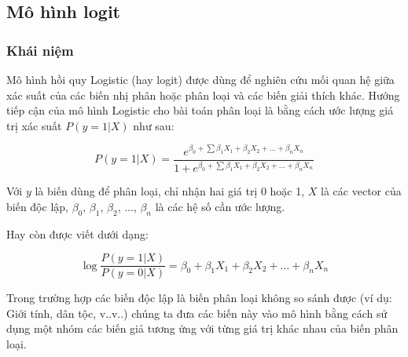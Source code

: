 \documentclass[a4paper]{report}\usepackage[]{graphicx}\usepackage[]{color}
\begin{document}
\subsection{Mô hình logit}

\subsubsection{Khái niệm}

Mô hình hồi quy Logistic (hay logit) được dùng để nghiên cứu mối quan hệ giữa xác suất của các biến nhị phân hoặc phân loại và các biến giải thích khác. Hướng tiếp cận của mô hình Logistic cho bài toán phân loại là bằng cách ước lượng giá trị xác suất $P(y = 1|X)$ như sau:

{\large
$$
P(y = 1|X) = \frac{e^{\beta_0 + \sum\beta_1X_1 +\beta_2X_2 + \ldots + \beta_nX_n}}{1 + e^{\beta_0 + \sum\beta_1X_1 +\beta_2X_2 + \ldots + \beta_nX_n}}
$$
}

Với $y$ là biến dùng để phân loại, chỉ nhận hai giá trị 0 hoặc 1, $X$ là các vector của biến độc lập, $\beta_0$, $\beta_1$, $\beta_2$, ..., $\beta_n$ là các hệ số cần ước lượng. 

Hay còn được viết dưới dạng:

{\large
$$
\log\frac{P(y = 1|X)}{P(y = 0|X)} = \beta_0 + \beta_1X_1 +\beta_2X_2 + \ldots + \beta_nX_n
$$
}

 
Trong trường hợp các biến độc lập là biến phân loại không so sánh được (ví dụ: Giới tính, dân tộc, v..v..) chúng ta đưa các biến này vào mô hình bằng cách sử dụng một nhóm các biến giả tương ứng với từng giá trị khác nhau của biến phân loại.
\end{document}
